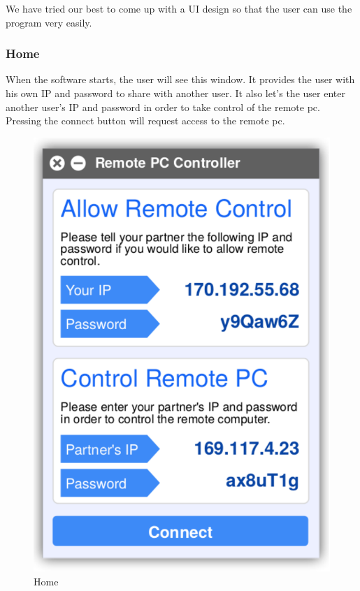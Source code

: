 \documentclass[12pt, a4paper]{article}
\begin{document}
We have tried our best to come up with a UI design so that the user can use the program very easily.

\subsubsection{Home}
When the software starts, the user will see this window. It provides the user with his own IP and password to share with another user. It also let's the user enter another user's IP and password in order to take control of the remote pc. Pressing the connect button will request access to the remote pc.

\begin{figure}[h!]
\centering
\includegraphics[scale=0.75]{home}
\caption{Home}
\end{figure}
\end{document}
